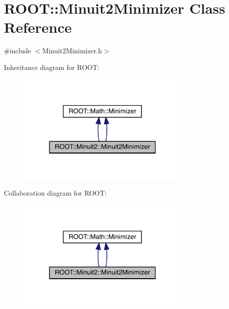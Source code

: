 \hypertarget{classROOT_1_1Minuit2_1_1Minuit2Minimizer}{}\section{R\+O\+OT\+:\+:Minuit2\+Minimizer Class Reference}
\label{classROOT_1_1Minuit2_1_1Minuit2Minimizer}


{\ttfamily \#include $<$Minuit2\+Minimizer.\+h$>$}



Inheritance diagram for R\+O\+OT\+:\nopagebreak
\begin{figure}[H]
\begin{center}
\leavevmode
\includegraphics[width=242pt]{de/d16/classROOT_1_1Minuit2_1_1Minuit2Minimizer__inherit__graph}
\end{center}
\end{figure}


Collaboration diagram for R\+O\+OT\+:\nopagebreak
\begin{figure}[H]
\begin{center}
\leavevmode
\includegraphics[width=242pt]{d6/d69/classROOT_1_1Minuit2_1_1Minuit2Minimizer__coll__graph}
\end{center}
\end{figure}
